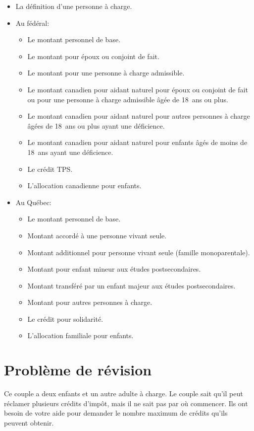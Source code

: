 \begin{itemize}[label=]
	\item La définition d'une personne à charge.
	\item Au fédéral:
	\begin{itemize}
		\item Le montant personnel de base.
		\item Le montant pour époux ou conjoint de fait.
		\item Le montant pour une personne à charge admissible.
		\item Le montant canadien pour aidant naturel pour époux ou conjoint de fait ou pour une personne à charge admissible âgée de 18~ans ou plus.
		\item Le montant canadien pour aidant naturel pour autres personnes à charge âgées de 18~ans ou plus ayant une déficience.
		\item Le montant canadien pour aidant naturel pour enfants âgés de moins de 18~ans ayant une déficience.
		\item Le crédit TPS.
		\item L'allocation canadienne pour enfants.
	\end{itemize}
	\item Au Québec:
	\begin{itemize}
		\item Le montant personnel de base.
		\item Montant accordé à une personne vivant seule.
		\item Montant additionnel pour personne vivant seule (famille monoparentale).
		\item Montant pour enfant mineur aux études postsecondaires.
		\item Montant transféré par un enfant majeur aux études postsecondaires.
		\item Montant pour autres personnes à charge.
		\item Le crédit pour solidarité.
		\item L'allocation familiale pour enfants.
	\end{itemize}
\end{itemize}



\section{Problème de révision}
Ce couple a deux enfants et un autre adulte à charge. Le couple sait qu'il peut réclamer plusieurs crédits d'impôt, mais il ne sait pas par où commencer. Ils ont besoin de votre aide pour demander le nombre maximum de crédits qu'ils peuvent obtenir.


